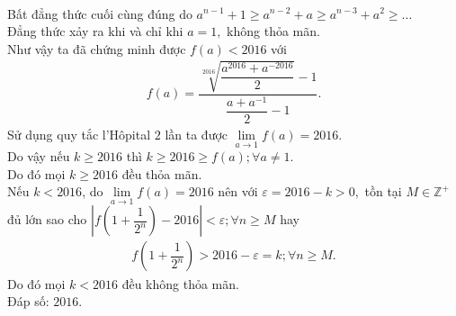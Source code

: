 \begin{bt}
{\begin{eqnarray*}
		\end{eqnarray*}
		Bất đẳng thức cuối cùng đúng do $ a^{n-1} + 1 \ge a^{n-2}+a \ge a^{n-3}+a^2 \ge \ldots  $\\
		Đẳng thức xảy ra khi và chỉ khi $ a = 1, $ không thỏa mãn.\\
		Như vậy ta đã chứng minh được $ f(a) < 2016 $ với 
		\begin{eqnarray*}
			f(a)=\dfrac{\sqrt[2016]{\dfrac{a^{2016}+a^{-2016}}{2} }-1 }{\dfrac{a+a^{-1}}{2}-1}.
		\end{eqnarray*}
		Sử dụng quy tắc l'Hôpital $ 2 $ lần ta được $ \lim\limits_{a \to 1} f(a)=2016. $\\
		Do vậy nếu $ k \ge 2016 $ thì $ k \ge 2016 \ge f(a); \forall a \ne 1. $\\
		Do đó mọi $ k \ge 2016 $ đều thỏa mãn.\\
		Nếu $ k < 2016 $, do $ \lim\limits_{a \to 1} f(a)=2016 $ nên với $ \varepsilon =2016-k > 0,$ tồn tại $ M \in \mathbb{Z}^+ $ đủ lớn sao cho $ \left|f \left( 1+\dfrac{1}{2^n}\right)-2016\right|<\varepsilon; \forall n \ge M $ hay 
		\begin{eqnarray*}
			f\left(1+\dfrac{1}{2^n}\right)> 2016 - \varepsilon = k; \forall n \ge M.
		\end{eqnarray*}
		Do đó mọi $ k<2016 $ đều không thỏa mãn.\\
		Đáp số: $ 2016. $
	}
\end{bt}
